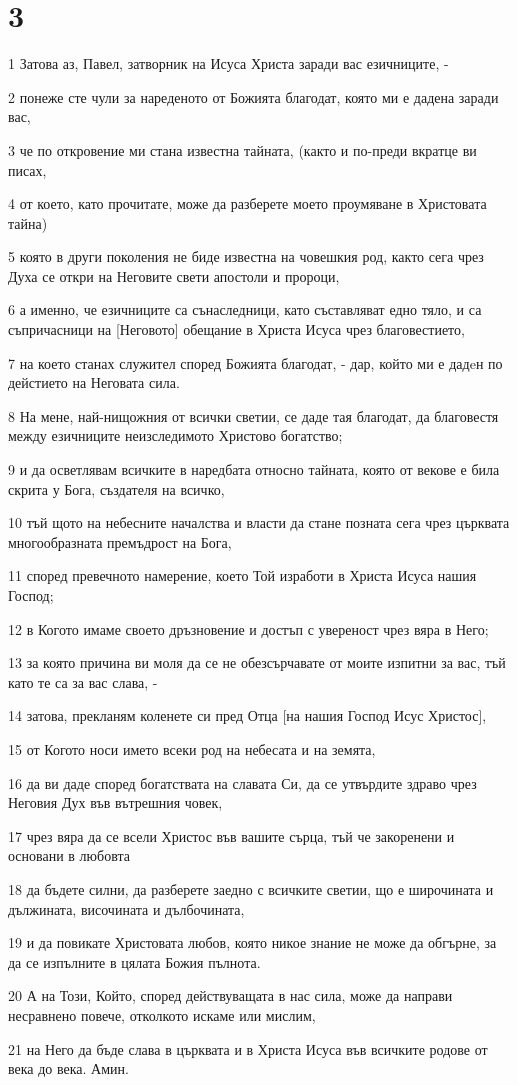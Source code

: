 \chapter{3}

\par 1 Затова аз, Павел, затворник на Исуса Христа заради вас езичниците, -
\par 2 понеже сте чули за нареденото от Божията благодат, която ми е дадена заради вас,
\par 3 че по откровение ми стана известна тайната, (както и по-преди вкратце ви писах,
\par 4 от което, като прочитате, може да разберете моето проумяване в Христовата тайна)
\par 5 която в други поколения не биде известна на човешкия род, както сега чрез Духа се откри на Неговите свети апостоли и пророци,
\par 6 а именно, че езичниците са сънаследници, като съставляват едно тяло, и са съпричасници на [Неговото] обещание в Христа Исуса чрез благовестието,
\par 7 на което станах служител според Божията благодат, - дар, който ми е дадeн по дейстието на Неговата сила.
\par 8 На мене, най-нищожния от всички светии, се даде тая благодат, да благовестя между езичниците неизследимото Христово богатство;
\par 9 и да осветлявам всичките в наредбата относно тайната, която от векове е била скрита у Бога, създателя на всичко,
\par 10 тъй щото на небесните началства и власти да стане позната сега чрез църквата многообразната премъдрост на Бога,
\par 11 според превечното намерение, което Той изработи в Христа Исуса нашия Господ;
\par 12 в Когото имаме своето дръзновение и достъп с увереност чрез вяра в Него;
\par 13 за която причина ви моля да се не обезсърчавате от моите изпитни за вас, тъй като те са за вас слава, -
\par 14 затова, прекланям коленете си пред Отца [на нашия Господ Исус Христос],
\par 15 от Когото носи името всеки род на небесата и на земята,
\par 16 да ви даде според богатствата на славата Си, да се утвърдите здраво чрез Неговия Дух във вътрешния човек,
\par 17 чрез вяра да се всели Христос във вашите сърца, тъй че закоренени и основани в любовта
\par 18 да бъдете силни, да разберете заедно с всичките светии, що е широчината и дължината, височината и дълбочината,
\par 19 и да повикате Христовата любов, която никое знание не може да обгърне, за да се изпълните в цялата Божия пълнота.
\par 20 А на Този, Който, според действуващата в нас сила, може да направи несравнено повече, отколкото искаме или мислим,
\par 21 на Него да бъде слава в църквата и в Христа Исуса във всичките родове от века до века. Амин.

